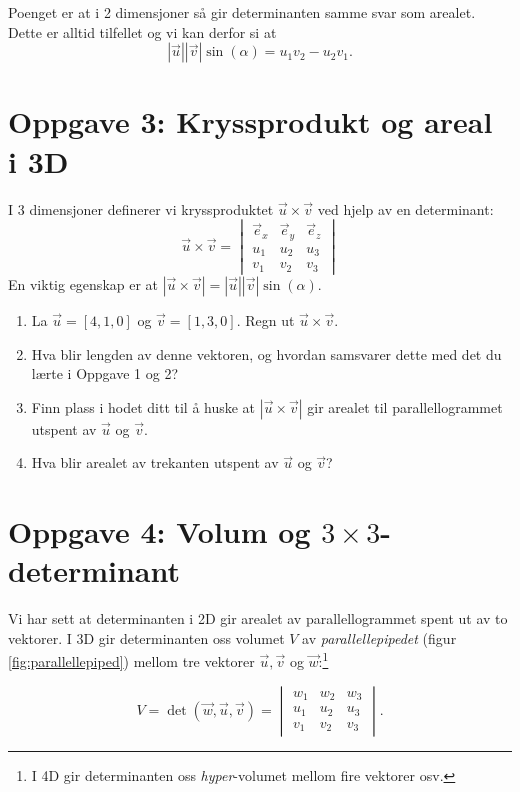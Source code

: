 \documentclass[a4paper,12pt]{article}
\begin{document}
Poenget er at i 2 dimensjoner så gir determinanten samme svar som arealet. Dette er alltid tilfellet og vi kan derfor si at
\begin{equation}
\label{eq:2dlikhet}
|\vec{u}| |\vec{v}| \sin(\alpha) =  u_1v_2 - u_2v_1.
\end{equation}

\section*{Oppgave 3: Kryssprodukt og areal i 3D}
I 3 dimensjoner definerer vi kryssproduktet $\vec{u} \times \vec{v}$ ved hjelp av en determinant:
\[
\vec{u} \times \vec{v} = \begin{vmatrix} \vec{e}_x & \vec{e}_y & \vec{e}_z \\ u_1 & u_2 & u_3 \\ v_1 & v_2 & v_3 \end{vmatrix}
\]
En viktig egenskap er at $|\vec{u} \times \vec{v}| = |\vec{u}| |\vec{v}| \sin(\alpha)$.

\begin{enumerate}
    \item[a)] La $\vec{u} = [4, 1, 0]$ og $\vec{v} = [1, 3, 0]$. Regn ut $\vec{u} \times \vec{v}$.
    \item[b)] Hva blir lengden av denne vektoren, og hvordan samsvarer dette med det du lærte i Oppgave 1 og 2?
	\item[c)] Finn plass i hodet ditt til å huske at $|\vec u \times \vec v|$ gir arealet til parallellogrammet utspent av $\vec u$ og $\vec v$.
	\item[d)] Hva blir arealet av trekanten utspent av $\vec u$ og $\vec v$?
\end{enumerate}

\newpage

\section*{\boldmath Oppgave 4: Volum og $3\times 3$-determinant}

Vi har sett at determinanten i 2D gir arealet av parallellogrammet spent ut av to vektorer. I 3D gir determinanten oss volumet $V$ av \textit{parallellepipedet} (figur \ref{fig:parallellepiped}) mellom tre vektorer $\vec{u}, \vec{v}$ og $\vec{w}$:\footnote{I 4D gir determinanten oss \textit{hyper}-volumet mellom fire vektorer osv.}

\[
V = \det(\vec w,\vec u,\vec v) = \begin{vmatrix} w_1 & w_2 & w_3 \\ u_1 & u_2 & u_3 \\ v_1 & v_2 & v_3 \end{vmatrix}.
\]
\end{document}
